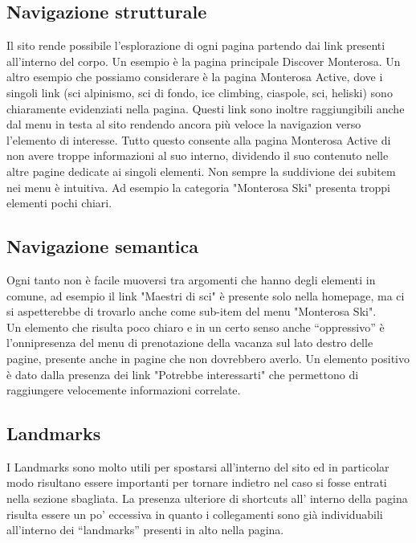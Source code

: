         \subsection{Navigazione strutturale}
        Il sito rende possibile l'esplorazione di ogni pagina partendo dai link
        presenti all’interno del corpo. Un esempio è  la pagina principale
        Discover Monterosa. Un altro esempio che possiamo considerare è la
        pagina Monterosa Active, dove i singoli link  (sci alpinismo, sci di
        fondo, ice climbing, ciaspole, sci, heliski) sono chiaramente
        evidenziati nella pagina. Questi link sono inoltre raggiungibili anche
        dal menu in testa al sito rendendo ancora più veloce la navigazion verso
        l’elemento di interesse. Tutto questo consente alla pagina Monterosa
        Active di non avere troppe informazioni al suo interno, dividendo il suo
        contenuto nelle altre pagine dedicate ai singoli elementi. Non sempre la
        suddivione dei subitem nei menu è intuitiva. Ad esempio la categoria
        "Monterosa Ski" presenta troppi elementi pochi chiari.

        \subsection{Navigazione semantica}
        Ogni tanto non è facile muoversi tra argomenti che hanno degli elementi
        in comune, ad esempio il link "Maestri di sci" è presente solo nella
        homepage, ma ci si aspetterebbe di trovarlo anche come sub-item del menu
        "Monterosa Ski". \\ Un elemento che risulta poco chiaro e in un
        certo senso anche “oppressivo” è l’onnipresenza del menu di
        prenotazione della vacanza sul lato destro delle pagine, presente anche
        in pagine che non dovrebbero averlo.
        Un elemento positivo è dato dalla presenza dei link
        "Potrebbe interessarti" che permettono di raggiungere velocemente
        informazioni correlate.

        \subsection{Landmarks}
        I Landmarks sono molto utili per spostarsi all'interno del sito ed in
        particolar modo risultano essere importanti per tornare indietro nel
        caso si fosse entrati nella sezione sbagliata. 
        La presenza ulteriore di shortcuts all’ interno della pagina risulta
        essere un po’ eccessiva in quanto i collegamenti sono già individuabili
        all'interno dei “landmarks” presenti in alto nella pagina.
  
